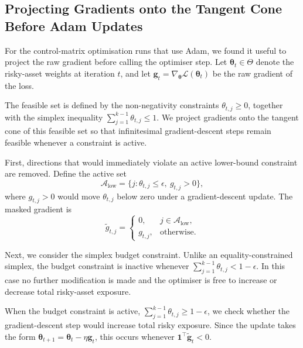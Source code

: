 \documentclass[11pt]{article}
\begin{document}
\subsection{Projecting Gradients onto the Tangent Cone Before Adam Updates}
\label{appendix:adam_projected_gradients}

For the control-matrix optimisation runs that use Adam, we found it useful to project the raw gradient before calling the optimiser step. Let \(\boldsymbol{\theta}_{t} \in \Theta\) denote the risky-asset weights at iteration \(t\), and let \(\mathbf{g}_{t}=\nabla_{\boldsymbol{\theta}}\mathcal{L}(\boldsymbol{\theta}_{t})\) be the raw gradient of the loss. 

The feasible set is defined by the non-negativity constraints \(\theta_{t,j}\geq 0\), together with the simplex inequality \(\sum_{j=1}^{k-1}\theta_{t,j}\leq 1\). We project gradients onto the tangent cone of this feasible set so that infinitesimal gradient-descent steps remain feasible whenever a constraint is active.

First, directions that would immediately violate an active lower-bound constraint are removed. Define the active set
\begin{equation}
\mathcal{A}_{\mathrm{low}}
=
\{j:\theta_{t,j}\leq\epsilon,\ g_{t,j}>0\},
\end{equation}
where \(g_{t,j}>0\) would move \(\theta_{t,j}\) below zero under a gradient-descent update. The masked gradient is
\begin{equation}
\tilde g_{t,j}
=
\begin{cases}
0, & j\in\mathcal{A}_{\mathrm{low}},\\
g_{t,j}, & \text{otherwise}.
\end{cases}
\end{equation}

Next, we consider the simplex budget constraint. Unlike an equality-constrained simplex, the budget constraint is inactive whenever \(\sum_{j=1}^{k-1}\theta_{t,j}<1-\epsilon\). In this case no further modification is made and the optimiser is free to increase or decrease total risky-asset exposure.

When the budget constraint is active, \(\sum_{j=1}^{k-1}\theta_{t,j}\geq 1-\epsilon\), we check whether the gradient-descent step would increase total risky exposure. Since the update takes the form \(\boldsymbol{\theta}_{t+1}=\boldsymbol{\theta}_{t}-\eta \mathbf{g}_{t}\), this occurs whenever \(\mathbf{1}^{\top}\tilde{\mathbf g}_{t}<0\).
\end{document}
